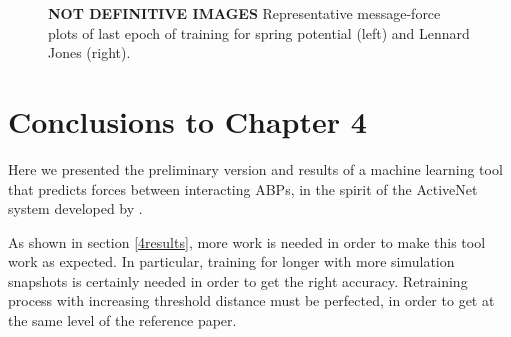 \documentclass[../../master_thesis_np.tex]{subfiles}
\begin{document}
\begin{figure}[tp]
	\centering
	\caption{\textbf{NOT DEFINITIVE IMAGES} Representative message-force plots of last epoch of training for spring potential (left) and Lennard Jones (right).}
	\label{fig:lincomb_last}
\end{figure}

\section{Conclusions to Chapter 4}

Here we presented the preliminary version and results of a machine learning tool that predicts forces between interacting ABPs, in the spirit of the ActiveNet system developed by \citeauthor{ruiz-garcia_discovering_2024}.

As shown in section \ref{4results}, more work is needed in order to make this tool work as expected.
In particular, training for longer with more simulation snapshots is certainly needed in order to get the right accuracy.
Retraining process with increasing threshold distance must be perfected, in order to get at the same level of the reference paper.
\end{document}
